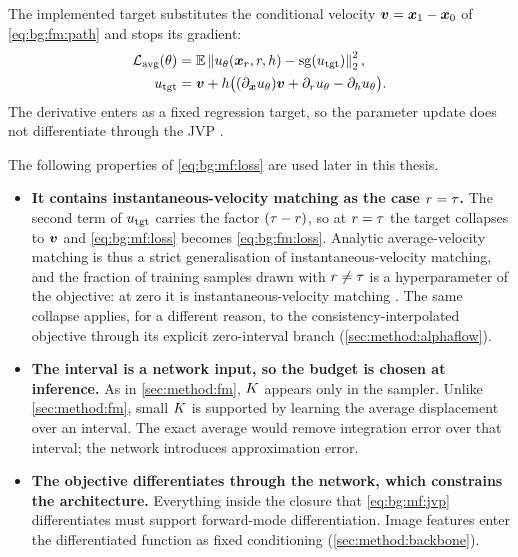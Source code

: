 The implemented target substitutes the conditional velocity
$\boldsymbol{v}=\boldsymbol{x}_{1}-\boldsymbol{x}_{0}$ of \eqref{eq:bg:fm:path} and stops its gradient:
\begin{equation}\label{eq:bg:mf:loss}
\begin{aligned}
  \mathcal{L}_{\textrm{avg}}(\theta)
    &=\mathbb{E}\left\|u_{\theta}(\boldsymbol{x}_{r},r,h)
           -\operatorname{sg}(u_{\textrm{tgt}})\right\|_{2}^{2},\\
  u_{\textrm{tgt}}
    &=\boldsymbol{v}+h\big((\partial_{\boldsymbol{x}}u_{\theta})\boldsymbol{v}
                     +\partial_{r}u_{\theta}-\partial_{h}u_{\theta}\big).
\end{aligned}
\end{equation}
The derivative enters as a fixed regression target, so the parameter update does not differentiate
through the JVP \parencite[Eqs.~(7)--(11)]{geng2025meanflow}.

The following properties of \eqref{eq:bg:mf:loss} are used later in this thesis.

\begin{itemize}
  \item \textbf{It contains instantaneous-velocity matching as the case $r = \tau$.} The second term of
    $u_{\textrm{tgt}}$ carries the factor $(\tau-r)$, so at $r=\tau$ the target collapses to
    $\boldsymbol{v}$ and \eqref{eq:bg:mf:loss} becomes \eqref{eq:bg:fm:loss}. Analytic
    average-velocity matching is thus a strict generalisation of instantaneous-velocity matching, and the fraction of training
    samples drawn with $r \neq \tau$ is a hyperparameter of the objective: at zero it is
    instantaneous-velocity matching
    \parencite[Tab.~1a]{geng2025meanflow}. The same collapse applies, for a different reason, to the
    consistency-interpolated objective through its explicit zero-interval branch
    (\autoref{sec:method:alphaflow}).
  \item \textbf{The interval is a network input, so the budget is chosen at inference.} As in
    \autoref{sec:method:fm}, $K$ appears only in the sampler. Unlike \autoref{sec:method:fm}, small $K$ is
    supported by learning the average displacement over an interval. The exact average would
    remove integration error over that interval; the network introduces approximation error.
  \item \textbf{The objective differentiates through the network, which constrains the
    architecture.} Everything inside the closure that \eqref{eq:bg:mf:jvp} differentiates must
    support forward-mode differentiation. Image features enter the differentiated function as
    fixed conditioning (\autoref{sec:method:backbone}).
\end{itemize}

